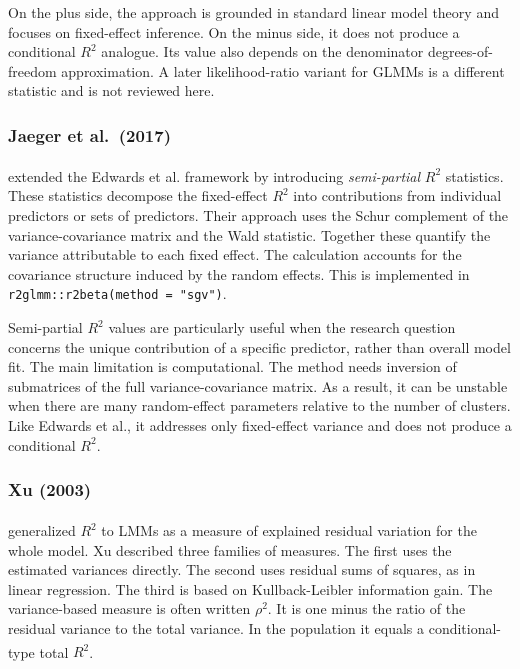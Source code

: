 \documentclass[
  11pt,
]{article}
\begin{document}
On the plus side, the approach is grounded in standard linear
model theory and focuses on fixed-effect inference. On the minus
side, it does not produce a conditional \(R^2\) analogue. Its value
also depends on the denominator degrees-of-freedom approximation.
A later likelihood-ratio variant for GLMMs is a different
statistic and is not reviewed here.

\subsubsection{Jaeger et al.~(2017)}\label{jaeger-et-al.-2017}

\textsuperscript{} extended the Edwards et al.
framework by introducing \emph{semi-partial} \(R^2\) statistics.
These statistics decompose the fixed-effect \(R^2\) into
contributions from individual predictors or sets of predictors.
Their approach uses the Schur complement of the
variance-covariance matrix and the Wald statistic. Together these
quantify the variance attributable to each fixed effect. The
calculation accounts for the covariance structure induced by the
random effects. This is implemented in
\texttt{r2glmm::r2beta(method\ =\ "sgv")}.

Semi-partial \(R^2\) values are particularly useful when the
research question concerns the unique contribution of a specific
predictor, rather than overall model fit. The main
limitation is computational. The method needs inversion of
submatrices of the full variance-covariance matrix. As a result,
it can be unstable when there are many random-effect parameters
relative to the number of clusters. Like Edwards et al., it
addresses only fixed-effect variance and does not produce a
conditional \(R^2\).

\subsubsection{Xu (2003)}\label{xu-2003}

\textsuperscript{} generalized \(R^2\) to LMMs as a
measure of explained residual variation for the whole model. Xu
described three families of measures. The first uses the
estimated variances directly. The second uses residual sums of
squares, as in linear regression. The third is based on
Kullback-Leibler information gain. The variance-based measure is
often written \(\rho^2\). It is one minus the ratio of the residual
variance to the total variance. In the population it equals a
conditional-type total \(R^2\)\textsuperscript{}.
\end{document}

